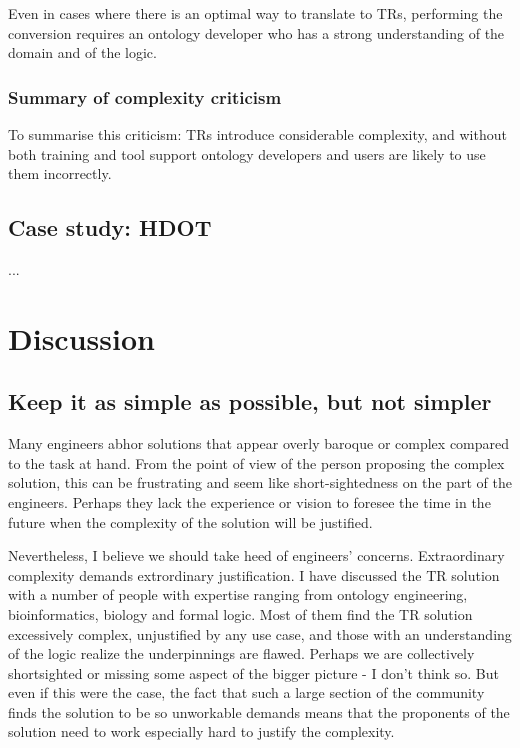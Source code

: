 \documentclass{bioinfo}
\begin{document}
Even in cases where there is an optimal way to translate to TRs,
performing the conversion requires an ontology developer who has a
strong understanding of the domain and of the logic.

\subsubsection{Summary of complexity criticism}

To summarise this criticism: TRs introduce considerable complexity,
and without both training and tool support ontology developers and
users are likely to use them incorrectly.



\subsection{Case study: HDOT}

...

\section{Discussion}


\subsection{Keep it as simple as possible, but not simpler}

Many engineers abhor solutions that appear overly baroque or complex
compared to the task at hand. From the point of view of the person
proposing the complex solution, this can be frustrating and seem like
short-sightedness on the part of the engineers. Perhaps they lack the
experience or vision to foresee the time in the future when the
complexity of the solution will be justified.

Nevertheless, I believe we should take heed of engineers'
concerns. Extraordinary complexity demands extrordinary justification.
I have discussed the TR solution with a number of people with
expertise ranging from ontology engineering, bioinformatics, biology
and formal logic. Most of them find the TR solution excessively
complex, unjustified by any use case, and those with an understanding
of the logic realize the underpinnings are flawed. Perhaps we are
collectively shortsighted or missing some aspect of the bigger picture
- I don't think so. But even if this were the case, the fact that such
a large section of the community finds the solution to be so
unworkable demands means that the proponents of the solution need to
work especially hard to justify the complexity.
\end{document}
